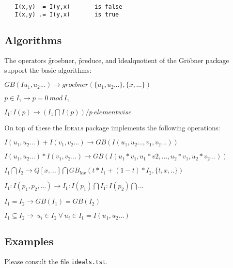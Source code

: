 \begin{verbatim}

   I(x,y)  = I(y,x)       is false
   I(x,y) .= I(y,x)       is true

\end{verbatim}

\subsection{Algorithms}

The operators \f{groebner}, \f{preduce}, and \f{idealquotient} of the
\REDUCE Gr\"obner package support the basic algorithms:

$GB(Iu_1,u_2...) \rightarrow groebner(\{u_1,u_2...\},\{x,...\})$

$p \in I_1 \rightarrow p=0 \ mod \ I_1$

$I_1 : I(p) \rightarrow (I_1 \bigcap I(p)) / p \ elementwise$

\noindent
On top of these the \textsc{Ideals} package implements the following 
operations:


$I(u_1,u_2...)+I(v_1,v_2...) \rightarrow GB(I(u_1,u_2...,v_1,v_2...))$


$I(u_1,u_2...)*I(v_1,v_2...)\rightarrow 
 GB(I(u_1*v_1,u_1*v2,...,u_2*v_1,u_2*v_2...))$


$I_1 \bigcap I_2 \rightarrow
  Q[x,...] \bigcap GB_{lex}(t*I_1 + (1-t)*I_2,\{t,x,..\}) $


$I_1 : I(p_1,p_2,...) \rightarrow I_1 : I(p_1) \bigcap I_1 : I(p_2)
\bigcap ...$

$I_1 = I_2 \rightarrow GB(I_1)=GB(I_2)$

$I_1 \subseteq I_2
   \rightarrow \ u_i \in I_2 \ \forall \ u_i \in I_1=I(u_1,u_2...)$

\subsection{Examples}

Please consult the file \texttt{ideals.tst}.
